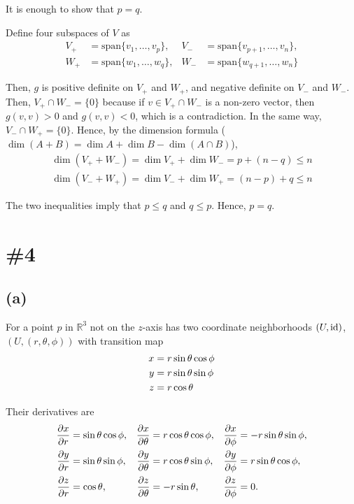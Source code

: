 \documentclass[a4paper,11pt]{article}
\begin{document}
It is enough to show that $p = q$. 

Define four subspaces of $V$ as
\begin{align}
    V_+ &= \text{span}\{v_1, \dots, v_p\}, & V_- &= \text{span}\{v_{p+1}, \dots, v_n\}, \\
    W_+ &= \text{span}\{w_1, \dots, w_q\}, & W_- &= \text{span}\{w_{q+1}, \dots, w_n\}
\end{align}

Then, $g$ is positive definite on $V_+$ and $W_+$, and negative definite on $V_-$ and $W_-$. Then, $V_+\cap W_- = \{0\}$ because if $v\in V_+\cap W_-$ is a non-zero vector, then $g(v, v) > 0$ and $g(v, v) < 0$, which is a contradiction. In the same way, $V_-\cap W_+ = \{0\}$. Hence, by the dimension formula ($\dim (A+B) = \dim A + \dim B - \dim (A \cap B)$), 
\begin{gather}
    \dim(V_+ + W_-) = \dim V_+ + \dim W_- = p + (n-q) \le n \\
    \dim(V_- + W_+) = \dim V_- + \dim W_+ = (n-p) + q \le n
\end{gather}

The two inequalities imply that $p \le q$ and $q \le p$. Hence, $p = q$.


\section{\#4}

\subsection{(a)}

For a point $p$ in $\mathbb{R}^3$ not on the $z$-axis has two coordinate neighborhoods $(U, \operatorname{id})$, $(U, (r, \theta, \phi))$ with transition map
\begin{align}
    x &= r \sin \theta \cos \phi \notag\\
    y &= r \sin \theta \sin \phi \notag\\
    z &= r \cos \theta
\end{align}

Their derivatives are
\begin{align}
    \frac{\partial x}{\partial r} &= \sin \theta \cos \phi, &
    \frac{\partial x}{\partial \theta} &= r \cos \theta \cos \phi, &
    \frac{\partial x}{\partial \phi} &= -r \sin \theta \sin \phi,\notag\\
    \frac{\partial y}{\partial r} &= \sin \theta \sin \phi, &
    \frac{\partial y}{\partial \theta} &= r \cos \theta \sin \phi,&
    \frac{\partial y}{\partial \phi} &= r \sin \theta \cos \phi,\notag\\
    \frac{\partial z}{\partial r} &= \cos\theta,&
    \frac{\partial z}{\partial \theta} &= -r\sin\theta,&
    \frac{\partial z}{\partial\phi} &= 0.
\end{align}
\end{document}
